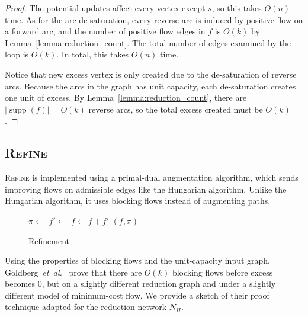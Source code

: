 \documentclass[11pt]{article}
\def\etal{\textit{et~al.}}
\def\fsupply{\phi}
\def\supp{\operatorname{supp}}
\theoremstyle{plain}
\numberwithin{figure}{section}
\begin{document}
\begin{proof}
The potential updates affect every vertex except $s$, so this takes $O(n)$
time.
As for the arc de-saturation, every reverse arc is induced by positive flow on
a forward arc, and the number of positive flow edges in $f$ is $O(k)$ by
Lemma~\ref{lemma:reduction_count}.
The total number of edges examined by the loop is $O(k)$.
In total, this takes $O(n)$ time.

Notice that new excess vertex is only created due to the
de-saturation of reverse arcs.
Because the arcs in the graph has unit capacity, each de-saturation creates one unit of
excess.
By Lemma~\ref{lemma:reduction_count}, there are $|\supp(f)| = O(k)$ reverse
arcs, so the total excess created must be $O(k)$.
\end{proof}


\subsection{\textsc{Refine}}

\textsc{Refine} is implemented using a primal-dual augmentation algorithm,
which sends improving flows on admissible edges like the Hungarian algorithm.
Unlike the Hungarian algorithm, it uses blocking flows instead of augmenting
paths.

\begin{figure*}[ht]
\centering
\begin{minipage}{.8\linewidth}
\begin{algorithm}[H]
\caption{Refinement}
\label{algorithm:refine}
\begin{algorithmic}[1]
	\While{$\sum_{v \in V} |\fsupply_f(v)| > 0$}
		\State $\pi \gets$ 
		\State $f' \gets$ 
		\State $f \gets f + f'$
	\EndWhile
	\State\Return $(f, \pi)$
\EndFunction
\end{algorithmic}
\end{algorithm}
\end{minipage}
\end{figure*}

Using the properties of blocking flows and the unit-capacity input graph,
Goldberg~{\etal}~\cite{GHKT17} prove that there are $O(k)$ blocking
flows before excess becomes 0, but on a slightly different reduction graph
and under a slightly different model of minimum-cost flow.
We provide a sketch of their proof technique adapted for the reduction network
$N_H$.
\end{document}
